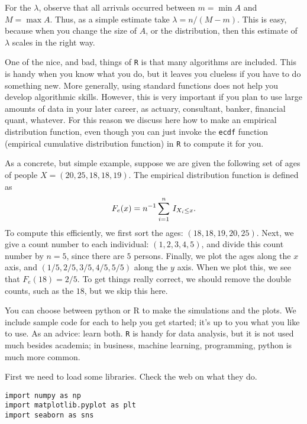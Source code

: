 \documentclass[a4paper]{article}
\begin{document}
For the \(\lambda\), observe that all arrivals occurred between \(m= \min A\) and \(M=\max A\). Thus, as a simple estimate take \(\lambda = n/(M-m)\). This is easy, because when you change the size of \(A\), or the distribution, then this estimate of \(\lambda\) scales in the right way.


One of the nice, and bad, things of \texttt{R} is that many algorithms are included.
This is handy when you know what you do, but it leaves you clueless  if you have to do something new.
More generally, using standard functions does not help you develop algorithmic skills.
However, this is very important if you plan to use large amounts of data in your later career, as actuary, consultant, banker, financial quant, whatever.
For this reason we discuss here how to make an empirical distribution function, even though you can just invoke the \texttt{ecdf} function (empirical cumulative distribution function) in \texttt{R} to compute it for you.

As a concrete, but simple example, suppose we are given the following set of ages of people \(X = (20, 25, 18, 18, 19)\). The empirical distribution function is defined as
\begin{equation*}
F_e(x) = n^{-1}\sum_{i=1}^n \,I_{X_i\leq x}.
\end{equation*}
To compute this efficiently, we first sort the ages: \((18, 18, 19, 20, 25)\). Next, we give a count number to each individual: \((1,2,3,4,5)\), and divide this count number by \(n=5\), since there are \(5\) persons. Finally, we plot the ages along the \(x\) axis, and \((1/5, 2/5, 3/5, 4/5, 5/5)\) along the \(y\) axis. When we plot this, we see that \(F_{e}(18) = 2/5\). To get things really correct, we should remove the double counts, such as the \(18\), but we skip this here. 


You can choose between  python  or R to make the simulations and the plots.
We include sample code for each to help you get started; it's up to you what you like to use.
As an advice: learn both.
\texttt{R} is handy for data analysis, but it is not used much besides academia; in business, machine learning, programming, python is much more common. 


First we need to load some libraries. Check the web on what they do.


\begin{verbatim}
import numpy as np
import matplotlib.pyplot as plt
import seaborn as sns
\end{verbatim}
\end{document}

